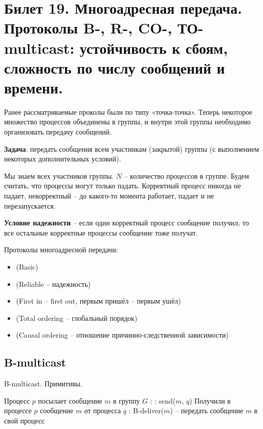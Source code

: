 \newpage
\section{Билет 19. Многоадресная передача. Протоколы B-, R-, CO-, ТО-multicast: устойчивость к сбоям, сложность по числу сообщений и времени.}

Ранее рассматриваемые проколы были по типу «точка-точка».
Теперь некоторое множество процессов объединены в группы, и внутри этой группы необходимо организовать передачу сообщений.

\textbf{Задача}: передать сообщения всем участникам (закрытой) группы (с выполнением некоторых дополнительных условий).

Мы знаем всех участников группы. $N$ -- количество процессов в группе. Будем считать, что процессы могут только падать.
Корректный процесс никогда не падает, некорректный -- до какого-то момента работает, падает и не перезапускается.

\textbf{Условие надежности} -- если один корректный процесс сообщение получил, то все остальные корректные процессы сообщение тоже получат.
\bigskip

Протоколы многоадресной передачи:
\begin{itemize}
	\item {} (Basic) %
	\item {} (Reliable -- надежность) %
	\item {} (First in -- first out, первым пришёл -- первым ушёл) %
	\item {} (Total ordering -- глобальный порядок) %
	\item {} (Causal ordering -- отношение причинно-следственной зависимости) %
\end{itemize}

\newpage
\subsection*{B-multicast}\label{b19:part1}

\begin{algorithm}[h!]
\caption{B-multicast. Примитивы.}
\begin{algorithmic}

\State Процесс $p$ посылает сообщение $m$ в группу $G$
:
	:
		\State send($m$, $q$)
	\EndFor
\EndProcedure
\State
\State Получили в процессе $p$ сообщение $m$ от процесса $q$
:
	\State B-deliver($m$) -- передать сообщение $m$ в свой процесс
\EndProcedure

\end{algorithmic}
\end{algorithm}

